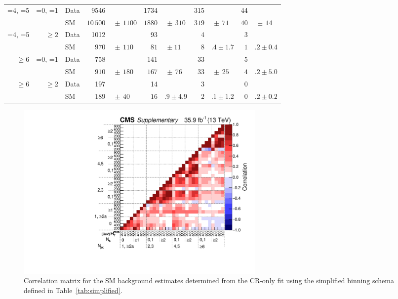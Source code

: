 \begin{table}[!t]
\begin{tabular}{rrlr@{}lr@{}lr@{}lr@{}l}
    =4, =5         & =0, =1    & Data & 9546       &                   & 1734      &                & 315   &               & 44                   \\
                   &           & SM   & $10\,500$    & $\,\pm\, 1100$    & $1880$    & $\,\pm\, 310$  & $319$ & $\,\pm\, 71$  & $40$  & $\,\pm\, 14$ \\[0.2ex]
    =4, =5         & ${\geq}2$ & Data & 1012       &                   & 93        &                & 4     &               & 3                    \\
                   &           & SM   & $970$      & $\,\pm\, 110$     & $81$      & $\, \pm 11$    & $8$   & $.4 \pm 1.7$  & $1$   & $.2 \pm 0.4$ \\[0.2ex]
    ${\geq}6$      & =0, =1    & Data & 758        &                   & 141       &                & 33    &               & 5                    \\
                   &           & SM   & $910$      & $\,\pm\, 180$     & $167$     & $\,\pm\, 76$   & $33$  & $\,\pm\, 25$  & $4$   & $.2 \pm 5.0$ \\[0.2ex]
    ${\geq}6$      & ${\geq}2$ & Data & 197        &                   & 14        &                & 3     &               & 0                    \\
                   &           & SM   & $189$      & $\,\pm\, 40$      & $16$      & $.9 \pm 4.9$   & $2$   & $.1 \pm 1.2$  & $0$   & $.2 \pm 0.2$ \\
    \hline
  \end{tabular}
\end{table}
\endgroup

\begin{figure}[!b]
  \centering
  \includegraphics[width=0.6\textwidth]{Figures/CMS-SUS-16-038_Figure_005.pdf}
  \caption{Correlation matrix for the SM background estimates
    determined from the CR-only fit using the simplified binning
    schema defined in Table~\ref{tab:simplified}.}
  \label{fig:correlation}
\end{figure} 
